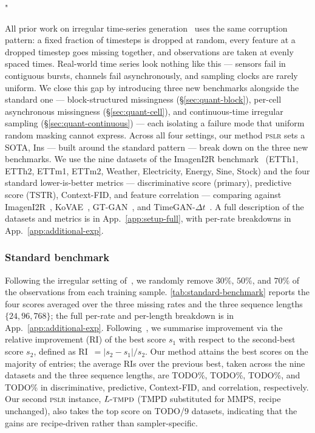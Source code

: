 "\documentclass{article}
\theoremstyle{plain}
\theoremstyle{definition}
\theoremstyle{remark}
\newcommand{\pslr}{\textsc{pslr}}
\newcommand{\ltmpd}{L\mbox{-}\textsc{tmpd}}
\begin{document}
All prior work on irregular time-series generation~\citep{yoon2019timegan,jeon2022gtgan,fadlon2025imageni2r} uses the same corruption pattern: a fixed fraction of timesteps is dropped at random, every feature at a dropped timestep goes missing together, and observations are taken at evenly spaced times. Real-world time series look nothing like this --- sensors fail in contiguous bursts, channels fail asynchronously, and sampling clocks are rarely uniform. We close this gap by introducing three new benchmarks alongside the standard one --- block-structured missingness (\S\ref{sec:quant-block}), per-cell asynchronous missingness (\S\ref{sec:quant-cell}), and continuous-time irregular sampling (\S\ref{sec:quant-continuous}) --- each isolating a failure mode that uniform random masking cannot express. Across all four settings, our method \pslr{} sets a SOTA, Ins --- built around the standard pattern --- break down on the three new benchmarks. We use the nine datasets of the ImagenI2R benchmark~\citep{fadlon2025imageni2r} (ETTh1, ETTh2, ETTm1, ETTm2, Weather, Electricity, Energy, Sine, Stock) and the four standard lower-is-better metrics --- discriminative score (primary), predictive score (TSTR), Context-FID, and feature correlation --- comparing against ImagenI2R~\citep{fadlon2025imageni2r}, KoVAE~\citep{naiman2024kovae}, GT-GAN~\citep{jeon2022gtgan}, and TimeGAN-$\Delta t$~\citep{yoon2019timegan,che2018recurrent}. A full description of the datasets and metrics is in App.~\ref{app:setup-full}, with per-rate breakdowns in App.~\ref{app:additional-exp}.

\subsubsection{Standard benchmark}
\label{sec:quant-standard}

Following the irregular setting of~\citep{yoon2019timegan,jeon2022gtgan}, we randomly remove $30\%$, $50\%$, and $70\%$ of the observations from each training sample. \cref{tab:standard-benchmark} reports the four scores averaged over the three missing rates and the three sequence lengths $\{24, 96, 768\}$; the full per-rate and per-length breakdown is in App.~\ref{app:additional-exp}. Following~\citet{naiman2024kovae}, we summarise improvement via the relative improvement (RI) of the best score $s_1$ with respect to the second-best score $s_2$, defined as RI~$=|s_2 - s_1|/s_2$. Our method attains the best scores on the majority of entries; the average RIs over the previous best, taken across the nine datasets and the three sequence lengths, are TODO\%, TODO\%, TODO\%, and TODO\% in discriminative, predictive, Context-FID, and correlation, respectively. Our second \pslr{} instance, $\ltmpd$ (TMPD substituted for MMPS, recipe unchanged), also takes the top score on TODO/$9$ datasets, indicating that the gains are recipe-driven rather than sampler-specific.
\end{document}
